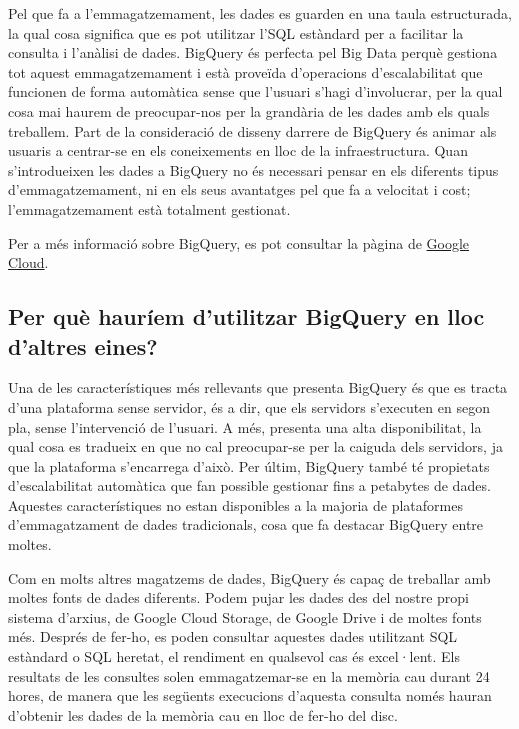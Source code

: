 \documentclass[12pt,longbibliography]{article}
\theoremstyle{definition}
\theoremstyle{remark}
\begin{document}
\vspace{2mm}

Pel que fa a l’emmagatzemament, les dades es guarden en una taula estructurada, la qual cosa significa que es pot utilitzar l’SQL estàndard per a facilitar la consulta i l’anàlisi de dades. BigQuery és perfecta pel Big Data perquè gestiona tot aquest emmagatzemament i està proveïda d’operacions d’escalabilitat que funcionen de forma automàtica sense que l’usuari s’hagi d’involucrar,  per la qual cosa mai haurem de preocupar-nos per la grandària de les dades amb els quals treballem. Part de la consideració de disseny darrere de BigQuery és animar als usuaris a centrar-se en els coneixements en lloc de la infraestructura. Quan s’introdueixen les dades a BigQuery no és necessari pensar en els diferents tipus d’emmagatzemament, ni en els seus avantatges pel que fa a velocitat i cost; l’emmagatzemament està totalment gestionat.

\vspace{2mm}
\noindent
Per a més informació sobre BigQuery, es pot consultar la pàgina de \href{https://cloud.google.com/bigquery/docs/introduction}{Google Cloud}.

\subsection{Per què hauríem d'utilitzar BigQuery en lloc d'altres eines?}

Una de les característiques més rellevants que presenta BigQuery és que es tracta d'una plataforma sense servidor, és a dir, que els servidors s'executen en segon pla, sense l'intervenció de l'usuari. A més, presenta una alta disponibilitat, la qual cosa es tradueix en que no cal preocupar-se per la caiguda dels servidors, ja que la plataforma s'encarrega d'això. Per últim, BigQuery també té propietats d'escalabilitat automàtica que fan possible gestionar fins a petabytes de dades. Aquestes característiques no estan disponibles a la majoria de plataformes d'emmagatzament de dades tradicionals, cosa que fa destacar BigQuery entre moltes.

\vspace{2mm}

Com en molts altres magatzems de dades, BigQuery és capaç de treballar amb moltes fonts de dades diferents. Podem pujar les dades des del nostre propi sistema d'arxius, de Google Cloud Storage, de Google Drive i de moltes fonts més. Després de fer-ho, es poden consultar aquestes dades utilitzant SQL estàndard o SQL heretat, el rendiment en qualsevol cas és excel·lent. Els resultats de les consultes solen emmagatzemar-se en la memòria cau durant 24 hores, de manera que les següents execucions d'aquesta consulta només hauran d'obtenir les dades de la memòria cau en lloc de fer-ho del disc. 
\end{document}
